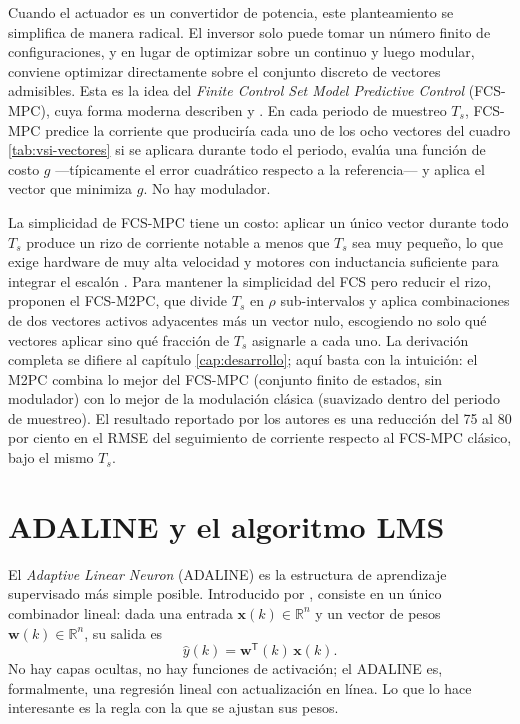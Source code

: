 \documentclass[../../../Tesis_JALS_Maestria.tex]{subfiles}
\begin{document}
Cuando el actuador es un convertidor de potencia, este planteamiento se simplifica de manera radical. El inversor solo puede tomar un número finito de configuraciones, y en lugar de optimizar sobre un continuo y luego modular, conviene optimizar directamente sobre el conjunto discreto de vectores admisibles. Esta es la idea del \textit{Finite Control Set Model Predictive Control} (FCS-MPC), cuya forma moderna describen \citet{rodriguez2007predictive} y \citet{kouro2009mpc}. En cada periodo de muestreo $T_s$, FCS-MPC predice la corriente que produciría cada uno de los ocho vectores del cuadro \ref{tab:vsi-vectores} si se aplicara durante todo el periodo, evalúa una función de costo $g$ ---típicamente el error cuadrático respecto a la referencia--- y aplica el vector que minimiza $g$. No hay modulador.

La simplicidad de FCS-MPC tiene un costo: aplicar un único vector durante todo $T_s$ produce un rizo de corriente notable a menos que $T_s$ sea muy pequeño, lo que exige hardware de muy alta velocidad y motores con inductancia suficiente para integrar el escalón \citep{coronado2025}. Para mantener la simplicidad del FCS pero reducir el rizo, \citet{coronado2025} proponen el FCS-M2PC, que divide $T_s$ en $\rho$ sub-intervalos y aplica combinaciones de dos vectores activos adyacentes más un vector nulo, escogiendo no solo qué vectores aplicar sino qué fracción de $T_s$ asignarle a cada uno. La derivación completa se difiere al capítulo \ref{cap:desarrollo}; aquí basta con la intuición: el M2PC combina lo mejor del FCS-MPC (conjunto finito de estados, sin modulador) con lo mejor de la modulación clásica (suavizado dentro del periodo de muestreo). El resultado reportado por los autores es una reducción del 75 al 80 por ciento en el RMSE del seguimiento de corriente respecto al FCS-MPC clásico, bajo el mismo $T_s$.

\section{ADALINE y el algoritmo LMS}
\label{sec:adaline}

El \textit{Adaptive Linear Neuron} (ADALINE) es la estructura de aprendizaje supervisado más simple posible. Introducido por \citet{widrow1960adaline}, consiste en un único combinador lineal: dada una entrada $\mathbf{x}(k) \in \mathbb{R}^n$ y un vector de pesos $\mathbf{w}(k) \in \mathbb{R}^n$, su salida es
\begin{equation}
    \hat{y}(k) = \mathbf{w}^{\mathsf T}(k)\,\mathbf{x}(k).
    \label{eq:adaline-salida}
\end{equation}
No hay capas ocultas, no hay funciones de activación; el ADALINE es, formalmente, una regresión lineal con actualización en línea. Lo que lo hace interesante es la regla con la que se ajustan sus pesos.
\end{document}
